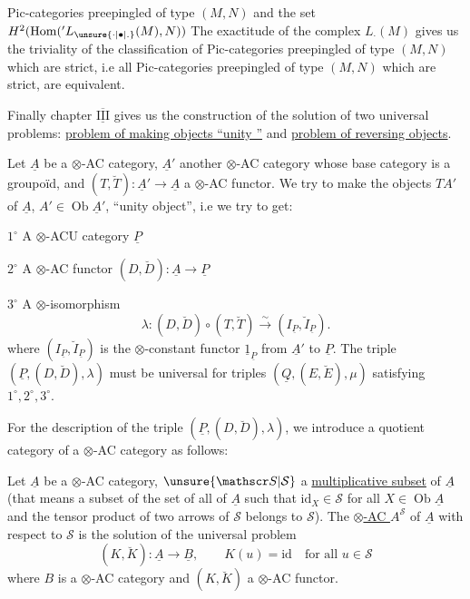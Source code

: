 Pic-categories preepingled of type $(M,N)$ and the set $H^2(\operatorname{Hom}({}'L_{\unsure{\cdot|\bullet|.}}(M),N))$
The exactitude of the complex $L_{\cdot}(M)$ gives us the triviality of the classification of Pic-categories preepingled of type $(M,N)$ which are strict, i.e all Pic-categories preepingled of type $(M,N)$ which are strict, are equivalent.

Finally chapter $\overline{\underline{\mathrm{III}}}$ gives us the construction of the solution of two universal problems: \uline{problem of making objects ``unity ''} and \uline{problem of reversing objects}.

Let $\underline A$ be a $\otimes$-AC category, $\underline A'$ another $\otimes$-AC category whose base category is a groupoïd, and $(T,\breve T):\underline A'\to\underline A$ a $\otimes$-AC functor. We try to make the objects $TA'$ of $\underline A$, $A'\in\operatorname{Ob}\underline A'$, ``unity object'',
i.e we try to get:

$1^\circ$ A $\otimes$-ACU category $\underline P$

$2^\circ$ A $\otimes$-AC functor $(D,\breve D):\underline A\to\underline P$

$3^\circ$ A $\otimes$-isomorphism
\[
\lambda:(D,\breve D)\circ(T,\breve T)\xrightarrow{\sim}(I_{\underline P},\breve I_{\underline P}).
\]
where $(I_{\underline P},\breve I_{\underline P})$ is the $\otimes$-constant functor $\underline{1}_{\underline P}$ from $\underline A'$ to $\underline P$. The triple $(\underline P,(D,\breve D),\lambda)$ must be universal for triples $(\underline Q,(E,\breve E),\mu)$ satisfying $1^\circ,2^\circ,3^\circ$.

For the description of the triple $(\underline P,(D,\breve D),\lambda)$, we introduce \margin{$\big|$}a quotient category of a $\otimes$-AC category as follows:

Let $\underline A$ be a $\otimes$-AC category, $\unsure{\mathscr S|\mathcal S}$ a \uline{multiplicative subset} of $\underline A$ (that means a subset of the set of all  of $\underline A$
such that $\mathrm{id}_X\in\mathscr S$ for all $X\in\operatorname{Ob}\underline A$ and the tensor product of two arrows of $\mathscr S$ belongs to $\mathscr S$). The \uline{$\otimes$-AC \mbox{}} $A^{\mathscr S}$ of $\underline A$ with respect to $\mathscr S$ is the solution of the universal problem
\[
(K,\breve K):\underline A\longrightarrow\underline B,\qquad K(u)=\mathrm{id}\quad\text{for all }u\in\mathscr S
\]
where $B$ is a $\otimes$-AC category and $(K,\breve K)$ a $\otimes$-AC functor.
